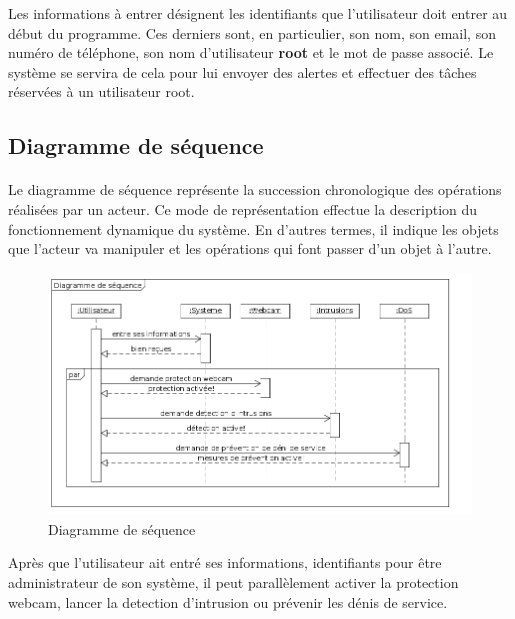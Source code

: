 	  Les informations à entrer désignent les identifiants que l'utilisateur doit entrer au début du programme. Ces derniers sont, en particulier, son nom, son email, son numéro de téléphone, son nom d'utilisateur \textbf{root} et le mot de passe associé. Le système se servira de cela pour lui envoyer des alertes et effectuer des tâches réservées à un utilisateur root.
\subsection{Diagramme de séquence}
 \paragraph{}
	  Le diagramme de séquence représente la succession chronologique des opérations réalisées par un acteur. Ce mode de représentation effectue la description du fonctionnement dynamique du système. En d'autres termes, il indique les objets que l'acteur va manipuler et les opérations qui font passer d'un objet à l'autre.
	  \begin{figure}[H]
		     \begin{center}
			\includegraphics[scale=0.5]{images/sequence.png}
		     \end{center}
		     \caption{Diagramme de séquence}
		     \label{Diagramme de cas d'utilisation}
	  \end{figure}
	  Après que l'utilisateur ait entré ses informations, identifiants pour être administrateur de son système, il peut parallèlement activer la protection webcam, lancer la detection d'intrusion ou prévenir les dénis de service.